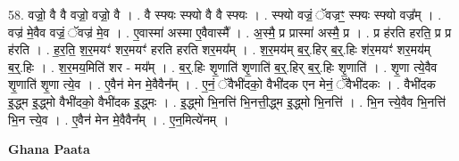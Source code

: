 \documentclass[17pt]{extarticle}
\begin{document}
58. वज्रो॒ वै वै वज्रो॒ वज्रो॒ वै । . वै स्फ्यः स्फ्यो वै वै स्फ्यः । . स्फ्यो वज्रं॒ ॅवज्रꣳ॒॒ स्फ्यः स्फ्यो वज्र᳚म् । . वज्र॑ मे॒वैव वज्रं॒ ॅवज्र॑ मे॒व । . ए॒वास्मा॑ अस्मा ए॒वैवास्मै᳚ । . अ॒स्मै॒ प्र प्रास्मा॑ अस्मै॒ प्र । . प्र ह॑रति हरति॒ प्र प्र ह॑रति । . ह॒र॒ति॒ श॒र॒मयꣳ॑ शर॒मयꣳ॑ हरति हरति शर॒मय᳚म् । . श॒र॒मय॑म् ब॒र्॒.हिर् ब॒र्॒.हिः श॑र॒मयꣳ॑ शर॒मय॑म् ब॒र्॒.हिः । . श॒र॒मय॒मिति॑ शर - मय᳚म् । . ब॒र्॒.हिः शृ॒णाति॑ शृ॒णाति॑ ब॒र्॒.हिर् ब॒र्॒.हिः शृ॒णाति॑ । . शृ॒णा त्ये॒वैव शृ॒णाति॑ शृ॒णा त्ये॒व । . ए॒वैन॑ मेन मे॒वैवैन᳚म् । . ए॒नं॒ ॅवैभी॑दको॒ वैभी॑दक एन मेनं॒ ॅवैभी॑दकः । . वैभी॑दक इ॒द्ध्म इ॒द्ध्मो वैभी॑दको॒ वैभी॑दक इ॒द्ध्मः । . इ॒द्ध्मो भि॒नत्ति॑ भि॒नत्ती॒द्ध्म इ॒द्ध्मो भि॒नत्ति॑ । . भि॒न त्त्ये॒वैव भि॒नत्ति॑ भि॒न त्त्ये॒व । . ए॒वैन॑ मेन मे॒वैवैन᳚म् । . ए॒न॒मित्ये॑नम् । \newline

\textbf{Ghana Paata } \newline
\end{document}

